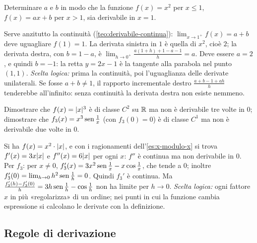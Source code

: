 \begin{esercizio}
Determinare $a$ e $b$ in modo che la funzione $f(x)=x^{2}$ per $x\le1$, $f(x)=ax+b$ per
$x>1$, sia derivabile in $x=1$.
\begin{soluzione}
Serve anzitutto la continuità (\cref{teo:derivabile-continua}): $\lim_{x\to1^{+}}f(x)=a+b$
deve uguagliare $f(1)=1$. La derivata sinistra in $1$ è quella di $x^{2}$, cioè $2$; la
derivata destra, con $b=1-a$, è
$\lim_{h\to0^{+}}\frac{a(1+h)+1-a-1}{h}=a$. Deve essere $a=2$, e quindi $b=-1$: la retta
$y=2x-1$ è la tangente alla parabola nel punto $(1,1)$. \emph{Scelta logica:} prima la
continuità, poi l'uguaglianza delle derivate unilaterali. Se fosse $a+b\neq1$, il
rapporto incrementale destro $\frac{a+b-1+ah}{h}$ tenderebbe all'infinito: senza
continuità la derivata destra non esiste nemmeno.
\end{soluzione}
\end{esercizio}

\begin{esercizio}
Dimostrare che $f(x)=\lvert x\rvert^{3}$ è di classe $C^{2}$ su $\mathbb{R}$ ma non è derivabile tre volte in
$0$; dimostrare che $f_{3}(x)=x^{3}\operatorname{sen}\frac1x$ (con $f_{3}(0)=0$) è di classe $C^{1}$ ma non
è derivabile due volte in $0$.
\begin{soluzione}
Si ha $f(x)=x^{2}\cdot\lvert x\rvert$, e con i ragionamenti dell'\cref{es:x-modulo-x} si trova
$f'(x)=3x\lvert x\rvert$ e $f''(x)=6\lvert x\rvert$ per ogni $x$: $f''$ è continua ma non derivabile in $0$.
Per $f_{3}$: per $x\neq0$, $f_{3}'(x)=3x^{2}\operatorname{sen}\frac1x-x\cos\frac1x$, che tende a $0$; inoltre
$f_{3}'(0)=\lim_{h\to0}h^{2}\operatorname{sen}\frac1h=0$. Quindi $f_{3}'$ è continua. Ma
$\frac{f_{3}'(h)-f_{3}'(0)}{h}=3h\operatorname{sen}\frac1h-\cos\frac1h$ non ha limite per $h\to0$.
\emph{Scelta logica:} ogni fattore $x$ in più «regolarizza» di un ordine; nei punti in cui
la funzione cambia espressione si calcolano le derivate con la definizione.
\end{soluzione}
\end{esercizio}

\subsection*{Regole di derivazione}

